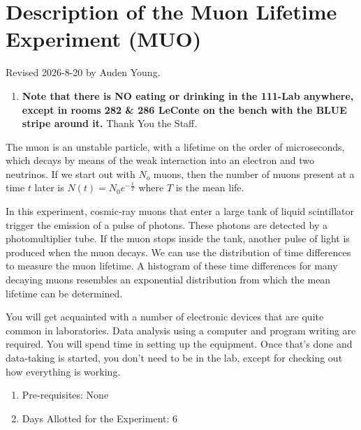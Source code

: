 \documentclass{../lab}
\begin{document}
\maketitle

\tableofcontents

\section{Description of the Muon Lifetime Experiment (MUO)}

Revised 2026-8-20 by Auden Young.

\begin{enumerate}
    \item \textbf{Note that there is NO eating or drinking in the 111-Lab anywhere, except in rooms 282 \& 286 LeConte on the bench with the BLUE stripe around it.} Thank You the Staff.

\end{enumerate}

The muon is an unstable particle, with a lifetime on the order of microseconds, which decays by means of the weak interaction into an electron and two neutrinos. If we start out with $N_o$ muons, then the number of muons present at a time $t$ later is $N(t) = N_0 e^{-\frac{t}{T}}$ where $T$ is the mean life.

In this experiment, cosmic-ray muons that enter a large tank of liquid scintillator trigger the emission of a pulse of photons. These photons are detected by a photomultiplier tube. If the muon stops inside the tank, another pulse of light is produced when the muon decays. We can use the distribution of time differences to measure the muon lifetime. A histogram of these time differences for many decaying muons resembles an exponential distribution from which the mean lifetime can be determined.

You will get acquainted with a number of electronic devices that are quite common in laboratories. Data analysis using a computer and program writing are required. You will spend time in setting up the equipment. Once that's done and data-taking is started, you don't need to be in the lab, except for checking out how everything is working.

\begin{enumerate}
    \item Pre-requisites: None

    \item Days Allotted for the Experiment: 6
\end{enumerate}
\end{document}
